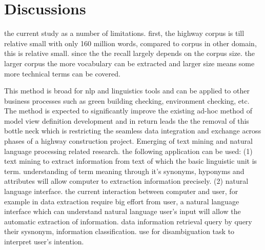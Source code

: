 \documentclass[Journal, InsideFigs, DoubleSpace]{ascelike} %
\begin{document}
\section{Discussions} \label{sec:dis}
the current study as a number of limitations. first, the highway corpus is till relative small with only 160 million words, compared to corpus in other domain, this is relative small. since the the recall largely depends on the corpus size. the larger corpus the more vocabulary can be extracted and larger size means some more technical terms can be covered.  
\par
This method is broad for nlp and linguistics tools and can be applied to other business processes such as green building checking, environment checking, etc. The method is expected to significantly improve the existing ad-hoc method of model view definition development and in return leads the the removal of this bottle neck which is restricting the seamless data integration and exchange across phases of a highway construction project. Emerging of text mining and natural language processing related research. the following application can be used: (1) text mining to extract information from text of which the basic linguistic unit is term. understanding of term meaning through it's synonyms, hyponyms and attributes will allow computer to extraction information precisely.   (2) natural language interface. the current interaction between computer and user, for example in data extraction require big effort from user, a natural language interface which can understand natural language user's input will allow the automatic extraction of information. data information retrieval query by query their sysnonym, information classification. use for disambiguation task to interpret user's intention.  
\end{document}
